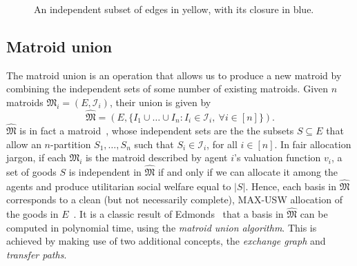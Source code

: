 \begin{figure}
  \centering
  \caption{An independent subset of edges in yellow, with its closure in blue.}
  \label{fig:ex-graph-closure}
\end{figure}

\subsection{Matroid union}
The matroid union is an operation that allows us to produce a new matroid by combining the independent sets of some number of existing matroids. Given $n$ matroids $\mathfrak{M}_i = (E, \mathcal{I}_i)$, their union is given by $$\widehat{\mathfrak{M}} = (E, \{ I_1\cup\ldots\cup I_n : I_i\in\mathcal{I}_i,\ \forall i\in[n] \}).$$ $\widehat{\mathfrak{M}}$ is in fact a matroid~\cite[Ch. 42]{schrijver-2003}, whose independent sets are the the subsets $S\subseteq E$ that allow an $n$-partition $S_1,\ldots,S_n$ such that $S_i\in\mathcal{I}_i$, for all $i\in[n]$. In fair allocation jargon, if each $\mathfrak{M}_i$ is the matroid described by agent $i$'s valuation function $v_i$, a set of goods $S$ is independent in $\widehat{\mathfrak{M}}$ if and only if we can allocate it among the agents and produce utilitarian social welfare equal to $|S|$. Hence, each basis in $\widehat{\mathfrak{M}}$ corresponds to a clean (but not necessarily complete), MAX-USW allocation of the goods in $E$~\cite{barman2021existence}. It is a classic result of Edmonds~\cite{Edmonds2009} that a basis in $\widehat{\mathfrak{M}}$ can be computed in polynomial time, using the \textit{matroid union algorithm}. This is achieved by making use of two additional concepts, the \textit{exchange graph} and \textit{transfer paths}. 

